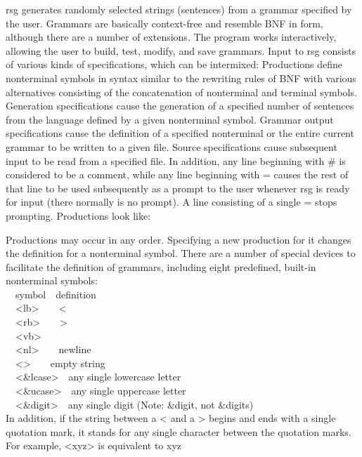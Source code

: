 \textsf{rsg} generates randomly selected strings
({\textquotedbl}sentences{\textquotedbl}) from a grammar specified by
the user. Grammars are basically context-free and resemble BNF in form,
although there are a number of extensions. The program works
interactively, allowing the user to build, test, modify, and save
grammars. Input to \textsf{rsg} consists of various kinds of
specifications, which can be intermixed: Productions define nonterminal
symbols in syntax similar to the rewriting rules of BNF with various
alternatives consisting of the concatenation of nonterminal and
terminal symbols. Generation specifications cause the generation of a
specified number of sentences from the language defined by a given
nonterminal symbol. Grammar output specifications cause the definition
of a specified nonterminal or the entire current grammar to be written
to a given file. Source specifications cause subsequent input to be
read from a specified file. In addition, any line beginning with \# is
considered to be a comment, while any line beginning with = causes the
rest of that line to be used subsequently as a prompt to the user
whenever \textsf{rsg} is ready for input (there normally is no prompt).
A line consisting of a single = stops prompting. Productions look like:


Productions may occur in any order. Specifying a new production for it
changes the definition for a nonterminal symbol. There are a number of
special devices to facilitate the definition of grammars, including
eight predefined, built-in nonterminal symbols:\\
\ \ symbol\ \ definition\\
\ \ {\textless}lb{\textgreater}\ \ \ \ {\textless}\\
\ \ {\textless}rb{\textgreater}\ \ \ \ {\textgreater}\\
\ \ {\textless}vb{\textgreater}\ \ \ \ {\textbar}\\
\ \ {\textless}nl{\textgreater}\ \ \ \ newline\\
\ \ {\textless}{\textgreater}\ \ \ \ empty string\\
\ \ {\textless}\&lcase{\textgreater}\ \ any single lowercase
letter\\
\ \ {\textless}\&ucase{\textgreater}\ \ any single uppercase
letter\\
\ \ {\textless}\&digit{\textgreater}\ \ any single digit (Note: \&digit,
not \&digits)\\
In addition, if the string between a {\textless} and a {\textgreater}
begins and ends with a single quotation mark, it stands for any single
character between the quotation marks. For example,
{\textless}{\textquotesingle}xyz{\textquotesingle}{\textgreater} is
equivalent to x{\textbar}y{\textbar}z

